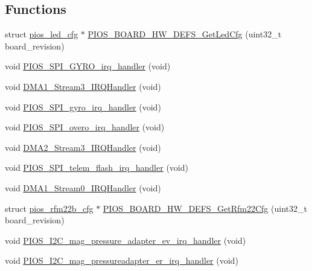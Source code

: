 \subsection*{\-Functions}
\begin{DoxyCompactItemize}
\item 
struct \hyperlink{structpios__led__cfg}{pios\-\_\-led\-\_\-cfg} $\ast$ \hyperlink{group___freedom_gafb76ae90816003eabf1d90feff7b1a52}{\-P\-I\-O\-S\-\_\-\-B\-O\-A\-R\-D\-\_\-\-H\-W\-\_\-\-D\-E\-F\-S\-\_\-\-Get\-Led\-Cfg} (uint32\-\_\-t board\-\_\-revision)
\item 
void \hyperlink{group___freedom_gad1fb9fec446e89bf7090083a927e4324}{\-P\-I\-O\-S\-\_\-\-S\-P\-I\-\_\-\-G\-Y\-R\-O\-\_\-irq\-\_\-handler} (void)
\item 
void \hyperlink{group___freedom_ga51d485393cf37043623c8bd0abae12a1}{\-D\-M\-A1\-\_\-\-Stream3\-\_\-\-I\-R\-Q\-Handler} (void)
\item 
void \hyperlink{group___freedom_ga6f05a1487b9b8de794d06f0e6241e983}{\-P\-I\-O\-S\-\_\-\-S\-P\-I\-\_\-gyro\-\_\-irq\-\_\-handler} (void)
\item 
void \hyperlink{group___freedom_ga794dd0e4b95b0ae19d9b81931f18fd00}{\-P\-I\-O\-S\-\_\-\-S\-P\-I\-\_\-overo\-\_\-irq\-\_\-handler} (void)
\item 
void \hyperlink{group___freedom_ga877135f6494d6923d6f6ec32d75d9eeb}{\-D\-M\-A2\-\_\-\-Stream3\-\_\-\-I\-R\-Q\-Handler} (void)
\item 
void \hyperlink{group___freedom_gac881c9cf27255a1660b19d2a75266b1b}{\-P\-I\-O\-S\-\_\-\-S\-P\-I\-\_\-telem\-\_\-flash\-\_\-irq\-\_\-handler} (void)
\item 
void \hyperlink{group___freedom_ga1b70a4441662b1d6548e803499da414f}{\-D\-M\-A1\-\_\-\-Stream0\-\_\-\-I\-R\-Q\-Handler} (void)
\item 
struct \hyperlink{structpios__rfm22b__cfg}{pios\-\_\-rfm22b\-\_\-cfg} $\ast$ \hyperlink{group___freedom_ga82ea8b6b6e602117e6fbadfe2d465de3}{\-P\-I\-O\-S\-\_\-\-B\-O\-A\-R\-D\-\_\-\-H\-W\-\_\-\-D\-E\-F\-S\-\_\-\-Get\-Rfm22\-Cfg} (uint32\-\_\-t board\-\_\-revision)
\item 
void \hyperlink{group___freedom_ga5be1ce2e09e73528c83cca2d79ac0b32}{\-P\-I\-O\-S\-\_\-\-I2\-C\-\_\-mag\-\_\-pressure\-\_\-adapter\-\_\-ev\-\_\-irq\-\_\-handler} (void)
\item 
void \hyperlink{group___freedom_gaa4478a056a506c7f1b70511154e01a86}{\-P\-I\-O\-S\-\_\-\-I2\-C\-\_\-mag\-\_\-pressureadapter\-\_\-er\-\_\-irq\-\_\-handler} (void)
\item 

\end{DoxyCompactItemize}
